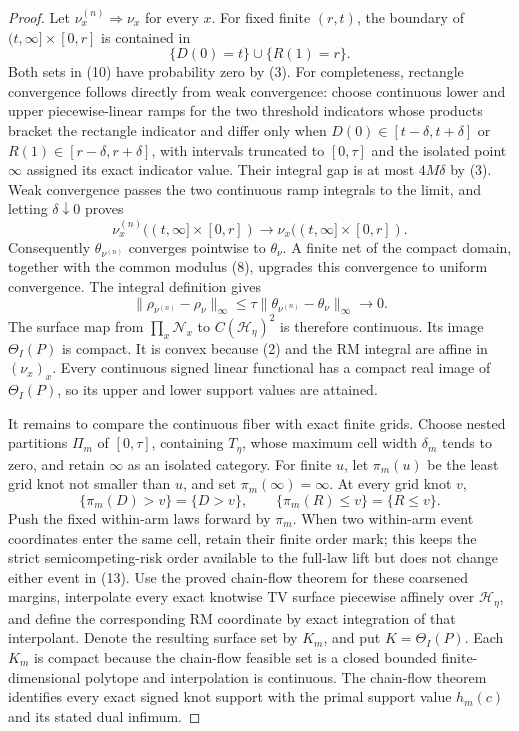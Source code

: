 \documentclass{article}
\begin{document}
\begin{proof}
Let \(\nu_x^{(n)}\Rightarrow\nu_x\) for every \(x\).  For fixed finite \((r,t)\), the boundary of \((t,\infty]\times[0,r]\) is contained in
\[
 \{D(0)=t\}\cup\{R(1)=r\}. \tag{10}
\]
Both sets in (10) have probability zero by (3).  For completeness, rectangle convergence follows directly from weak convergence: choose continuous lower and upper piecewise-linear ramps for the two threshold indicators whose products bracket the rectangle indicator and differ only when \(D(0)\in[t-\delta,t+\delta]\) or \(R(1)\in[r-\delta,r+\delta]\), with intervals truncated to \([0,\tau]\) and the isolated point \(\infty\) assigned its exact indicator value.  Their integral gap is at most \(4M\delta\) by (3).  Weak convergence passes the two continuous ramp integrals to the limit, and letting \(\delta\downarrow0\) proves
\[
 \nu_x^{(n)}((t,\infty]\times[0,r])
 \longrightarrow \nu_x((t,\infty]\times[0,r]). \tag{11}
\]
Consequently \(\theta_{\nu^{(n)}}\) converges pointwise to \(\theta_\nu\).  A finite net of the compact domain, together with the common modulus (8), upgrades this convergence to uniform convergence.  The integral definition gives
\[
 \|\rho_{\nu^{(n)}}-\rho_\nu\|_\infty
 \leq \tau\|\theta_{\nu^{(n)}}-\theta_\nu\|_\infty\longrightarrow0. \tag{12}
\]
The surface map from \(\prod_x\mathcal N_x\) to \(C(\mathcal H_\eta)^2\) is therefore continuous.  Its image \(\Theta_I(P)\) is compact.  It is convex because (2) and the RM integral are affine in \((\nu_x)_x\).  Every continuous signed linear functional has a compact real image of \(\Theta_I(P)\), so its upper and lower support values are attained.

It remains to compare the continuous fiber with exact finite grids.  Choose nested partitions \(\Pi_m\) of \([0,\tau]\), containing \(T_\eta\), whose maximum cell width \(\delta_m\) tends to zero, and retain \(\infty\) as an isolated category.  For finite \(u\), let \(\pi_m(u)\) be the least grid knot not smaller than \(u\), and set \(\pi_m(\infty)=\infty\).  At every grid knot \(v\),
\[
 \{\pi_m(D)>v\}=\{D>v\},
 \qquad
 \{\pi_m(R)\leq v\}=\{R\leq v\}. \tag{13}
\]
Push the fixed within-arm laws forward by \(\pi_m\).  When two within-arm event coordinates enter the same cell, retain their finite order mark; this keeps the strict semicompeting-risk order available to the full-law lift but does not change either event in (13).  Use the proved chain-flow theorem for these coarsened margins, interpolate every exact knotwise TV surface piecewise affinely over \(\mathcal H_\eta\), and define the corresponding RM coordinate by exact integration of that interpolant.  Denote the resulting surface set by \(K_m\), and put \(K=\Theta_I(P)\).  Each \(K_m\) is compact because the chain-flow feasible set is a closed bounded finite-dimensional polytope and interpolation is continuous.  The chain-flow theorem identifies every exact signed knot support with the primal support value \(h_m(c)\) and its stated dual infimum.


\end{proof}
\end{document}
